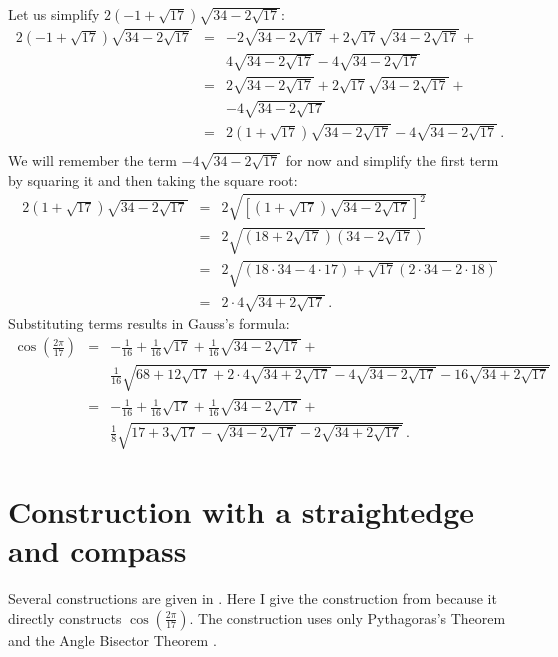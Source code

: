\documentclass[11pt,a4paper]{article}
\newenvironment{form}[1]{%
\begin{displaymath}%
\renewcommand{\arraystretch}{#1}%
\begin{array}{lcl}}%
{\end{array}%
\end{displaymath}%
}
\newcommand*{\disfrac}[2]{\displaystyle\frac{#1}{#2}}
\begin{document}
Let us simplify $2(-1+\sqrt{17})\sqrt{34-2\sqrt{17}}$:
\begin{form}{1.7}
2(-1+\sqrt{17})\sqrt{34-2\sqrt{17}} &=&
-2\sqrt{34-2\sqrt{17}} +2\sqrt{17}\sqrt{34-2\sqrt{17}}+\\
&&4\sqrt{34-2\sqrt{17}}-4\sqrt{34-2\sqrt{17}}\\
&=&
2\sqrt{34-2\sqrt{17}} +2\sqrt{17}\sqrt{34-2\sqrt{17}}+\\
&&-4\sqrt{34-2\sqrt{17}}\\
&=&2(1+\sqrt{17})\sqrt{34-2\sqrt{17}}-4\sqrt{34-2\sqrt{17}}\,.\\
\end{form}
We will remember the term $-4\sqrt{34-2\sqrt{17}}$ for now and simplify the first term by squaring it and then taking the square root:
\begin{form}{1.8}
2(1+\sqrt{17})\sqrt{34-2\sqrt{17}}&=&
2\sqrt{\left[(1+\sqrt{17})\sqrt{34-2\sqrt{17}}\right]^2}\\
&=&2\sqrt{(18+2\sqrt{17})(34-2\sqrt{17})}\\
&=&2\sqrt{(18\cdot 34-4\cdot17)+\sqrt{17}(2\cdot 34 - 2\cdot 18)}\\
&=&2\cdot 4\sqrt{34+2\sqrt{17}}\,.
\end{form}
Substituting terms results in Gauss's formula:
\begin{form}{2.2}
\cos\left(\disfrac{2\pi}{17}\right) &=& 
-\disfrac{1}{16}+\disfrac{1}{16}\sqrt{17} + 
     \disfrac{1}{16}\sqrt{34-2\sqrt{17}}
    + \\
    &&
     \disfrac{1}{16}\sqrt{
     68+12\sqrt{17} + 
     2\cdot 4\sqrt{34+2\sqrt{17}}-4\sqrt{34-2\sqrt{17}}
   -16
     \sqrt{34+2\sqrt{17}}
   }\\
&=&-\disfrac{1}{16}+\frac{1}{16}\sqrt{17} + 
     \disfrac{1}{16}\sqrt{34-2\sqrt{17}}
    + \\
    &&
     \disfrac{1}{8}\sqrt{
     17+3\sqrt{17} - 
     \sqrt{34-2\sqrt{17}}
   -2
     \sqrt{34+2\sqrt{17}}
   }\,.
\end{form}

\newpage

\section{Construction with a straightedge and compass}\label{s.construction}
Several constructions are given in \cite{wiki:heptadecagon}. Here I give the construction from \cite{callagy} because it directly constructs $\cos\left( \disfrac{2\pi}{17}\right)$. The construction uses only Pythagoras's Theorem and the Angle Bisector Theorem \cite{wiki:bisector}.
\end{document}
